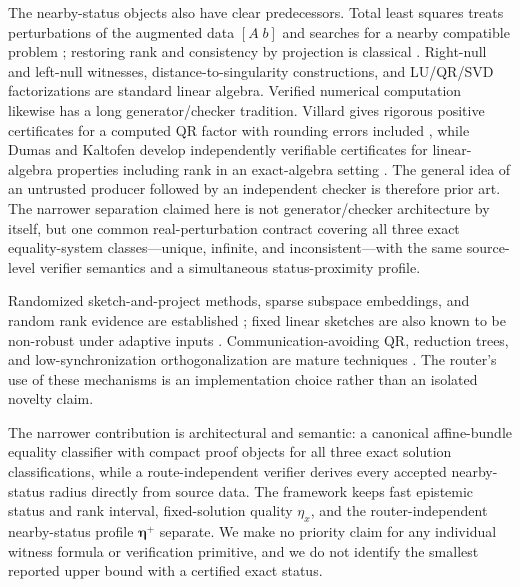 \documentclass[11pt]{article}
\theoremstyle{definition}
\begin{document}
The nearby-status objects also have clear predecessors. Total least squares treats perturbations of the augmented data $[A\;b]$ and searches for a nearby compatible problem \citep{GolubVanLoan1980}; restoring rank and consistency by projection is classical \citep{VanDerSluisVeltkamp1979}. Right-null and left-null witnesses, distance-to-singularity constructions, and LU/QR/SVD factorizations are standard linear algebra. Verified numerical computation likewise has a long generator/checker tradition. Villard gives rigorous positive certificates for a computed QR factor with rounding errors included \citep{Villard2007}, while Dumas and Kaltofen develop independently verifiable certificates for linear-algebra properties including rank in an exact-algebra setting \citep{DumasKaltofen2014}. The general idea of an untrusted producer followed by an independent checker is therefore prior art. The narrower separation claimed here is not generator/checker architecture by itself, but one common real-perturbation contract covering all three exact equality-system classes---unique, infinite, and inconsistent---with the same source-level verifier semantics and a simultaneous status-proximity profile.

Randomized sketch-and-project methods, sparse subspace embeddings, and random rank evidence are established \citep{GowerRichtarik2015,ClarksonWoodruff2013,NelsonNguyen2013}; fixed linear sketches are also known to be non-robust under adaptive inputs \citep{HardtWoodruff2013}. Communication-avoiding QR, reduction trees, and low-synchronization orthogonalization are mature techniques \citep{DemmelEtAl2008,CarsonLundMaOktay2024,CarsonMa2024}. The router's use of these mechanisms is an implementation choice rather than an isolated novelty claim.

The narrower contribution is architectural and semantic: a canonical affine-bundle equality classifier with compact proof objects for all three exact solution classifications, while a route-independent verifier derives every accepted nearby-status radius directly from source data. The framework keeps fast epistemic status and rank interval, fixed-solution quality $\eta_x$, and the router-independent nearby-status profile $\boldsymbol\eta^+$ separate. We make no priority claim for any individual witness formula or verification primitive, and we do not identify the smallest reported upper bound with a certified exact status.
\end{document}
